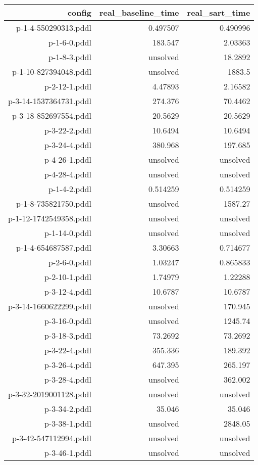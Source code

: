 \documentclass{article}
\begin{document}
                            \begin{center}
                            \scriptsize
                            \begin{tabular}{r|r|r}
                            config & real\_baseline\_time & real\_sart\_time\\\midrule
                             p-1-4-550290313.pddl&0.497507&0.490996\\
 p-1-6-0.pddl&183.547&2.03363\\
 p-1-8-3.pddl&unsolved&18.2892\\
 p-1-10-827394048.pddl&unsolved&1883.5\\
 p-2-12-1.pddl&4.47893&2.16582\\
 p-3-14-1537364731.pddl&274.376&70.4462\\
 p-3-18-852697554.pddl&20.5629&20.5629\\
 p-3-22-2.pddl&10.6494&10.6494\\
 p-3-24-4.pddl&380.968&197.685\\
 p-4-26-1.pddl&unsolved&unsolved\\
 p-4-28-4.pddl&unsolved&unsolved\\
 p-1-4-2.pddl&0.514259&0.514259\\
 p-1-8-735821750.pddl&unsolved&1587.27\\
 p-1-12-1742549358.pddl&unsolved&unsolved\\
 p-1-14-0.pddl&unsolved&unsolved\\
 p-1-4-654687587.pddl&3.30663&0.714677\\
 p-2-6-0.pddl&1.03247&0.865833\\
 p-2-10-1.pddl&1.74979&1.22288\\
 p-3-12-4.pddl&10.6787&10.6787\\
 p-3-14-1660622299.pddl&unsolved&170.945\\
 p-3-16-0.pddl&unsolved&1245.74\\
 p-3-18-3.pddl&73.2692&73.2692\\
 p-3-22-4.pddl&355.336&189.392\\
 p-3-26-4.pddl&647.395&265.197\\
 p-3-28-4.pddl&unsolved&362.002\\
 p-3-32-2019001128.pddl&unsolved&unsolved\\
 p-3-34-2.pddl&35.046&35.046\\
 p-3-38-1.pddl&unsolved&2848.05\\
 p-3-42-547112994.pddl&unsolved&unsolved\\
 p-3-46-1.pddl&unsolved&unsolved
                            \end{tabular}
                            \end{center}
                    
\end{document}
